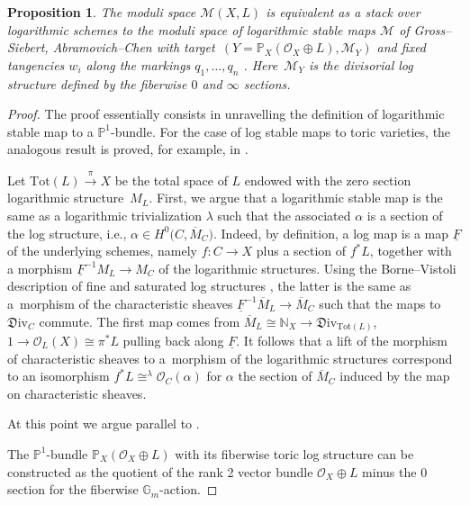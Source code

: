 \documentclass[11pt]{article}
\numberwithin{equation}{section}
\newcommand{\PP}{\mathbb{P}}
\newcommand{\M}{\mathcal{M}}
\renewcommand{\bar}{\overline}
\numberwithin{equation}{section}
\newtheorem{prop}[theo]{Proposition}
\theoremstyle{definition}
\begin{document}
\begin{prop}\label{prop:logstabelmaps}
The moduli space $\M(X,L)$ is equivalent as a stack over logarithmic schemes to the moduli space of logarithmic stable maps $\M$ of Gross--Siebert, Abramovich--Chen with target~${(Y=\PP_X(\mathcal O_X\oplus L),\mathcal M_Y)}$ and fixed tangencies $w_i$ along the markings $q_1,\dots,q_n$ {\rm\cite{abramovich2014stable,gross2013logarithmic}}. Here~$\mathcal M_Y$ is the divisorial log structure defined by the fiberwise $0$ and $\infty$ sections.
\end{prop}
\begin{proof}
The proof essentially consists in unravelling the definition of logarithmic stable map to a $\mathbb P^1$-bundle. For the case of log stable maps to toric varieties, the analogous result is proved, for example, in \cite[Proposition~2.5.1.1]{RSPW2}.

Let $\mathrm{Tot}(L)\xrightarrow{\pi} X$ be the total space of $L$ endowed with the zero section logarithmic structure~$M_L$. First, we argue that a logarithmic stable map
 is the same as a logarithmic trivialization $\lambda$ such that the associated $\alpha$ is a section of the log structure, i.e., $\alpha\in H^0\bigl(C,\bar{M}_C\bigr)$.
Indeed, by definition, a log map is a map $\underline{F}$ of the underlying schemes, namely $f\colon C\to X$ plus a section of $f^*L$, together with a morphism $\underline{F}^{-1}M_L\to M_C$ of the logarithmic structures. Using the Borne--Vistoli description of fine and saturated log structures \cite{BorneVistoli}, the latter is the same as a~morphism of the characteristic sheaves $\underline{F}^{-1}\bar{M}_L\to \bar{M}_C$ such that the maps to $\mathfrak{D}\mathrm{iv}_C$ commute. The first map comes from
$
 \bar{M}_L\cong\mathbb N_X\to \mathfrak{D}\mathrm{iv}_{\mathrm{Tot}(L)}$, $
1\to \mathcal O_L(X)\cong \pi^* L
$
pulling back along $\underline{F}$. It follows that a lift of the morphism of characteristic sheaves to a~morphism of the logarithmic structures correspond to an isomorphism $f^*L\cong^{\lambda}\mathcal O_C(\alpha)$ for $\alpha$ the section of $\bar{M}_C$ induced by the map on characteristic sheaves.

At this point we argue parallel to \cite[Section~2.5.1]{RSPW2}.

The $\mathbb P^1$-bundle $\mathbb P_X(\mathcal O_X\oplus L)$ with its fiberwise toric log structure can be constructed as the quotient of the rank 2 vector bundle $\mathcal O_X\oplus L$ minus the $0$ section for the fiberwise $\mathbb G_m$-action.


\end{proof}
\end{document}
